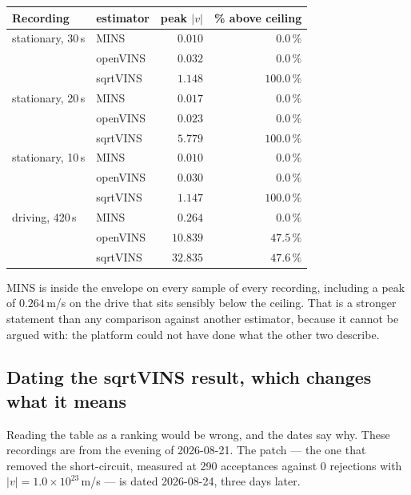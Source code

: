 \begin{center}
\begin{tabular}{@{}llrr@{}}
\toprule
Recording & estimator & peak $|v|$ & \% above ceiling \\
\midrule
stationary, 30\,s & MINS & $0.010$ & $0.0\,\%$ \\
                  & openVINS & $0.032$ & $0.0\,\%$ \\
                  & sqrtVINS & $1.148$ & $\mathbf{100.0\,\%}$ \\
\midrule
stationary, 20\,s & MINS & $0.017$ & $0.0\,\%$ \\
                  & openVINS & $0.023$ & $0.0\,\%$ \\
                  & sqrtVINS & $\mathbf{5.779}$ & $\mathbf{100.0\,\%}$ \\
\midrule
stationary, 10\,s & MINS & $0.010$ & $0.0\,\%$ \\
                  & openVINS & $0.030$ & $0.0\,\%$ \\
                  & sqrtVINS & $1.147$ & $\mathbf{100.0\,\%}$ \\
\midrule
driving, 420\,s   & MINS & $0.264$ & $0.0\,\%$ \\
                  & openVINS & $10.839$ & $47.5\,\%$ \\
                  & sqrtVINS & $\mathbf{32.835}$ & $47.6\,\%$ \\
\bottomrule
\end{tabular}
\end{center}

\noindent MINS is inside the envelope on every sample of every recording,
including a peak of $0.264$\,m/s on the drive that sits sensibly below the
ceiling. That is a stronger statement than any comparison against another
estimator, because it cannot be argued with: the platform could not have
done what the other two describe.

\subsection{Dating the sqrtVINS result, which changes what it means}

Reading the table as a ranking would be wrong, and the dates say why.
These recordings are from the evening of 2026-08-21. The
 patch --- the one that removed the
 short-circuit, measured at 290 acceptances
against 0 rejections with $|v| = 1.0\times10^{23}$\,m/s --- is dated
2026-08-24, three days later.

